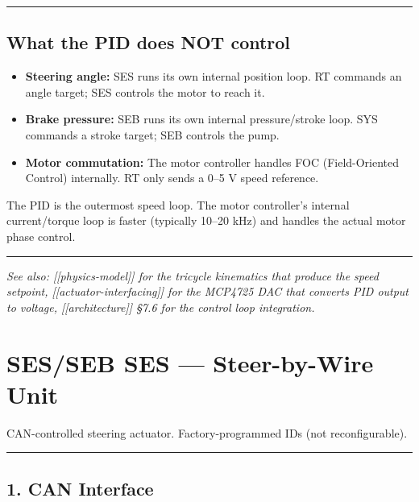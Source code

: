 \documentclass[12pt,a4paper,oneside]{report}
\providecommand{\tightlist}{\setlength{\itemsep}{0pt}\setlength{\parskip}{0pt}}
\begin{document}
\begin{center}\rule{0.5\linewidth}{0.5pt}\end{center}

\section{What the PID does NOT control}\label{what-the-pid-does-not-control}

\begin{itemize}
\tightlist
\item
  \textbf{Steering angle:} SES runs its own internal position loop. RT
  commands an angle target; SES controls the motor to reach it.
\item
  \textbf{Brake pressure:} SEB runs its own internal pressure/stroke loop. SYS
  commands a stroke target; SEB controls the pump.
\item
  \textbf{Motor commutation:} The motor controller handles FOC (Field-Oriented
  Control) internally. RT only sends a 0--5 V speed reference.
\end{itemize}

The PID is the outermost speed loop. The motor controller's internal
current/torque loop is faster (typically 10--20 kHz) and handles the actual
motor phase control.

\begin{center}\rule{0.5\linewidth}{0.5pt}\end{center}

\emph{See also: {[}{[}physics-model{]}{]} for the tricycle kinematics that
produce the speed setpoint, {[}{[}actuator-interfacing{]}{]} for the MCP4725 DAC
that converts PID output to voltage, {[}{[}architecture{]}{]} §7.6 for the
control loop integration.}


\chapter{SES/SEB SES --- Steer-by-Wire
Unit}\label{SES/SEB-SES-steer-by-wire-unit}

CAN-controlled steering actuator. Factory-programmed IDs (not reconfigurable).

\begin{center}\rule{0.5\linewidth}{0.5pt}\end{center}

\section{1. CAN Interface}\label{can-interface}
\end{document}
